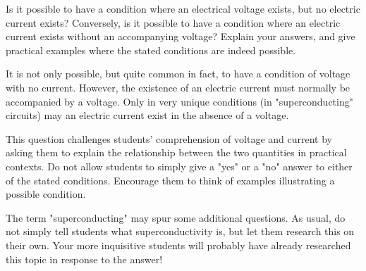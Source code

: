 

Is it possible to have a condition where an electrical voltage exists, but no electric current exists?  Conversely, is it possible to have a condition where an electric current exists without an accompanying voltage?  Explain your answers, and give practical examples where the stated conditions are indeed possible.







It is not only possible, but quite common in fact, to have a condition of voltage with no current.  However, the existence of an electric current must normally be accompanied by a voltage.  Only in very unique conditions (in "superconducting" circuits) may an electric current exist in the absence of a voltage.







This question challenges students' comprehension of voltage and current by asking them to explain the relationship between the two quantities in practical contexts.  Do not allow students to simply give a "yes" or a "no" answer to either of the stated conditions.  Encourage them to think of examples illustrating a possible condition.

The term "superconducting" may spur some additional questions.  As usual, do not simply tell students what superconductivity is, but let them research this on their own.  Your more inquisitive students will probably have already researched this topic in response to the answer!




